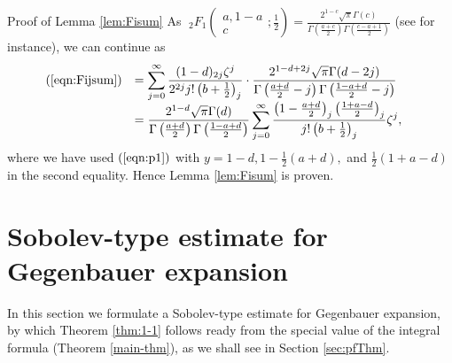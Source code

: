 \documentclass[12pt]{article}
\numberwithin{equation}{section}
\newenvironment{proof*}[1]{\noindent{\textit{#1.\ }}}{\hspace*{\fill}$\Box$\medskip}
\newcommand{\mygrammarfootnote}[1]{}
\begin{document}
\begin{proof*}{Proof of Lemma \ref{lem:Fisum}}
  As $\;_2 F_1 \left( \begin{array}{c}
    a, 1 - a\\
    c
  \end{array} ; \displaystyle\frac{1}{2} \right) =\displaystyle \frac{2^{1 - c} \sqrt{\pi} \Gamma
  (c)}{\Gamma \left( \frac{a + c}{2} \right) \Gamma \left( \frac{c - a + 1}{2}
  \right)}$ (see {\cite[Thm. 5.4]{andrews2000special}} for instance), we can
  continue as
  \begin{eqnarray}
    & \begin{array}{ll}
      (\ref{eqn:Fijsum}) & = \displaystyle\sum_{j = 0}^{\infty} \frac{(1 - d)_{2 j}
      \zeta^j}{2^{2 j} j! \left( b + \frac{1}{2} \right)_j} \cdot \frac{2^{1 -
      d + 2 j} \sqrt{\pi} \Gamma (d - 2 j)}{\Gamma \left( \frac{a + d}{2} - j
      \right) \Gamma \left( \frac{1 - a + d}{2} - j \right)}\\
      &\displaystyle = \frac{2^{1 - d} \sqrt{\pi} \Gamma (d)}{\Gamma \left( \frac{a +
      d}{2} \right) \Gamma \left( \frac{1 - a + d}{2} \right)} \displaystyle\sum_{j =
      0}^{\infty} \frac{\left( 1 - \frac{a + d}{2} \right)_j \left( \frac{1 +
      a - d}{2} \right)_j}{j! \left( b + \frac{1}{2} \right)_j} \zeta^j,
    \end{array} &  \nonumber
  \end{eqnarray}
  where we have used $(\ref{eqn:p1})$ with $y = 1 - d, 1 - \frac{1}{2} (a +
  d),$ and $\frac{1}{2} (1 + a - d)$ in the second equality. Hence Lemma
  \ref{lem:Fisum} is proven.
\end{proof*}

\section{Sobolev-type estimate for Gegenbauer expansion}\label{sec:Sobolev}
In this section we formulate a Sobolev-type estimate for Gegenbauer expansion, by which
Theorem \ref{thm:1-1} follows ready\mygrammarfootnote{readily?} from the special value of the integral formula (Theorem \ref{main-thm}),
as we shall see in Section \ref{sec:pfThm}.
\end{document}
